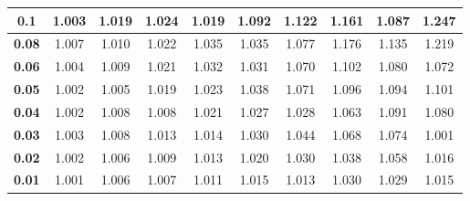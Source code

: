 \documentclass[letterpaper]{mandc2019}
\begin{document}
{\begin{table}[htb]
{\begin{tabular}{c|c|c|c|c|c|c|c|c|c}
\bf 0.1& 1.003 & 1.019 & 1.024 & 1.019 & 1.092 & 1.122 & 1.161 & 1.087 & 1.247 \\ \hline
\bf 0.08& 1.007 & 1.010 & 1.022 & 1.035 & 1.035 & 1.077 & 1.176 & 1.135 & 1.219 \\ \hline
\bf 0.06& 1.004 & 1.009 & 1.021 & 1.032 & 1.031 & 1.070 & 1.102 & 1.080 & 1.072 \\ \hline
\bf 0.05& 1.002 & 1.005 & 1.019 & 1.023 & 1.038 & 1.071 & 1.096 & 1.094 & 1.101 \\ \hline
\bf 0.04& 1.002 & 1.008 & 1.008 & 1.021 & 1.027 & 1.028 & 1.063 & 1.091 & 1.080 \\ \hline
\bf 0.03& 1.003 & 1.008 & 1.013 & 1.014 & 1.030 & 1.044 & 1.068 & 1.074 & \cellcolor{red!25}1.001 \\ \hline
\bf 0.02& 1.002 & 1.006 & 1.009 & 1.013 & 1.020 & 1.030 & 1.038 & 1.058 & 1.016 \\ \hline
\bf 0.01& \cellcolor{red!25}1.001 & 1.006 & 1.007 & 1.011 & 1.015 & 1.013 & 1.030 & 1.029 & 1.015 \\ \hline

  \end{tabular}
 } 
  
  \label{og_table}
\end{table}

\begin{table}[htb]
\centering
\caption{\bf The percent improvement of the original load balancing algorithm (left) and the load balancing by dimension algorithm (right).}
\end{table}}
\end{document}
